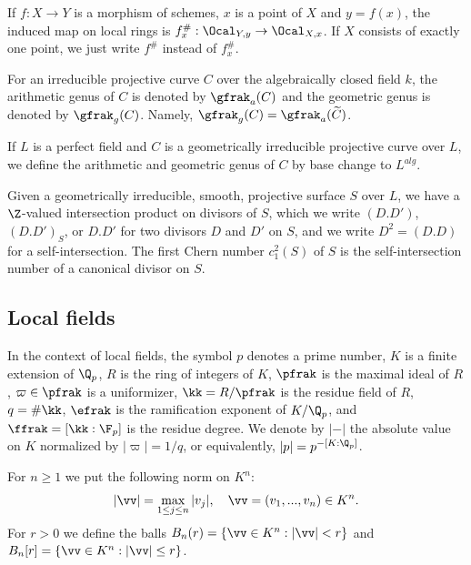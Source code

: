 If $f:X\to Y$ is a morphism of schemes, $x$ is a point of $X$ and $y=f(x)$, the induced map on local rings is $f^\#_x : \Ocal_{Y,y}\to \Ocal_{X,x}$. If $X$ consists of exactly one point, we just write $f^\#$ instead of $f^\#_x$.


For an irreducible projective curve $C$ over the algebraically closed field $k$, the arithmetic genus of $C$ is denoted by $\gfrak_a(C)$ and the geometric genus is denoted by $\gfrak_g(C)$. Namely, $\gfrak_g(C)=\gfrak_a(\widetilde{C})$.

If $L$ is a perfect field and $C$ is a geometrically irreducible projective curve over $L$, we define the arithmetic and geometric genus of $C$ by base change to $L^{alg}$.

Given a geometrically irreducible, smooth, projective surface $S$ over $L$, we have a $\Z$-valued intersection product on divisors of $S$, which we write $(D.D')$, $(D.D')_S$, or $D.D'$ for two divisors $D$ and $D'$ on $S$, and we write $D^2=(D.D)$ for a self-intersection. The first Chern number $c_1^2(S)$ of $S$ is the self-intersection number of a canonical divisor on $S$.

\subsection{Local fields}\label{NotationLoc} In the context of local fields, the symbol $p$ denotes a prime number, $K$ is a finite extension of $\Q_p$, $R$ is the ring of integers of $K$, $\pfrak$ is the maximal ideal of $R$, $\varpi\in \pfrak$ is a uniformizer, $\kk=R/\pfrak$ is the residue field of $R$, $q=\# \kk$, $\efrak$ is the ramification exponent of $K/\Q_p$, and $\ffrak=[\kk : \F_p]$ is the residue degree. We denote by $|-|$ the absolute value on $K$ normalized by $|\varpi|=1/q$, or equivalently, $|p|=p^{-[K:\Q_p]}$.


For $n\ge 1$ we put the following norm on $K^n$:
$$
|\vv | = \max_{1\le j\le n}|v_j|, \quad \vv =(v_1,...,v_n)\in K^n.
$$
For $r>0$ we define the balls $B_n(r)=\{\vv \in K^n : |\vv |<r\}$ and  $B_n[r]=\{\vv \in K^n : |\vv |\le r\}$.









